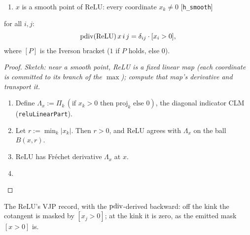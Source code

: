 

\begin{theorem}
  \label{ax:pdiv_relu}
  \leanok
  \Assume{}
  \begin{enumerate}
    \item \(x\) is a smooth point of \(\mathrm{ReLU}\): every
          coordinate \(x_k \neq 0\) \hfill[\texttt{h\_smooth}]
  \end{enumerate}
  \Prove{} for all \(i, j\):
  \[
    \operatorname{pdiv}(\mathrm{ReLU})\, x\, i\, j
      = \delta_{ij} \cdot [x_i > 0],
  \]
  where \([P]\) is the Iverson bracket (\(1\) if \(P\) holds, else \(0\)).
\end{theorem}

\begin{proof}
\leanok
\emph{Sketch: near a smooth point, ReLU is a fixed linear map
(each coordinate is committed to its branch of the \(\max\)); compute
that map's derivative and transport it.}
\begin{enumerate}
  \item Define \(\Lambda_x := \Pi_k\,
    (\text{if } x_k > 0 \text{ then } \mathrm{proj}_k \text{ else } 0)\),
    the diagonal indicator CLM (\texttt{reluLinearPart}).
  \item Let \(r := \min_k |x_k|\). Then \(r > 0\), and \(\mathrm{ReLU}\)
    agrees with \(\Lambda_x\) on the ball \(B(x, r)\).
  \item \(\mathrm{ReLU}\) has Fréchet derivative \(\Lambda_x\) at \(x\).
  \item \Qed{}
\end{enumerate}
\end{proof}

\begin{definition}
  \label{thm:reluHasVJP}
  \leanok
  The ReLU's VJP record, with the \(\operatorname{pdiv}\)-derived backward: off the kink
  the cotangent is masked by \([x_j > 0]\); at the kink it is zero, as the
  emitted mask \([x > 0]\) is.
\end{definition}

